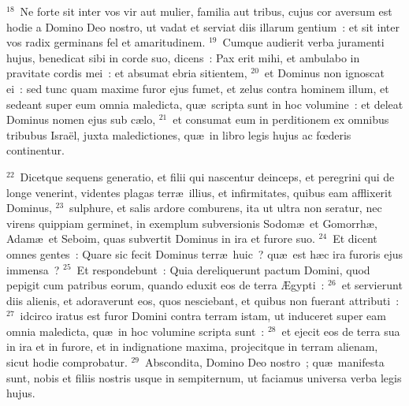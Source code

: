 ${}^{18}$~Ne forte sit inter vos vir aut mulier, familia aut tribus, cujus cor aversum est hodie a Domino Deo nostro, ut vadat et serviat diis illarum gentium~: et sit inter vos radix germinans fel et amaritudinem.
${}^{19}$~Cumque audierit verba juramenti hujus, benedicat sibi in corde suo, dicens~: Pax erit mihi, et ambulabo in pravitate cordis mei~: et absumat ebria sitientem,
${}^{20}$~et Dominus non ignoscat ei~: sed tunc quam maxime furor ejus fumet, et zelus contra hominem illum, et sedeant super eum omnia maledicta, qu\ae\ scripta sunt in hoc volumine~: et deleat Dominus nomen ejus sub c\ae lo,
${}^{21}$~et consumat eum in perditionem ex omnibus tribubus Isra\"el, juxta maledictiones, qu\ae\ in libro legis hujus ac fœderis continentur.


${}^{22}$~Dicetque sequens generatio, et filii qui nascentur deinceps, et peregrini qui de longe venerint, videntes plagas terr\ae\ illius, et infirmitates, quibus eam afflixerit Dominus,
${}^{23}$~sulphure, et salis ardore comburens, ita ut ultra non seratur, nec virens quippiam germinet, in exemplum subversionis Sodom\ae\ et Gomorrh\ae , Adam\ae\ et Seboim, quas subvertit Dominus in ira et furore suo.
${}^{24}$~Et dicent omnes gentes~: Quare sic fecit Dominus terr\ae\ huic~? qu\ae\ est h\ae c ira furoris ejus immensa~?
${}^{25}$~Et respondebunt~: Quia dereliquerunt pactum Domini, quod pepigit cum patribus eorum, quando eduxit eos de terra \AE gypti~:
${}^{26}$~et servierunt diis alienis, et adoraverunt eos, quos nesciebant, et quibus non fuerant attributi~:
${}^{27}$~idcirco iratus est furor Domini contra terram istam, ut induceret super eam omnia maledicta, qu\ae\ in hoc volumine scripta sunt~:
${}^{28}$~et ejecit eos de terra sua in ira et in furore, et in indignatione maxima, projecitque in terram alienam, sicut hodie comprobatur.
${}^{29}$~Abscondita, Domino Deo nostro~; qu\ae\ manifesta sunt, nobis et filiis nostris usque in sempiternum, ut faciamus universa verba legis hujus.

